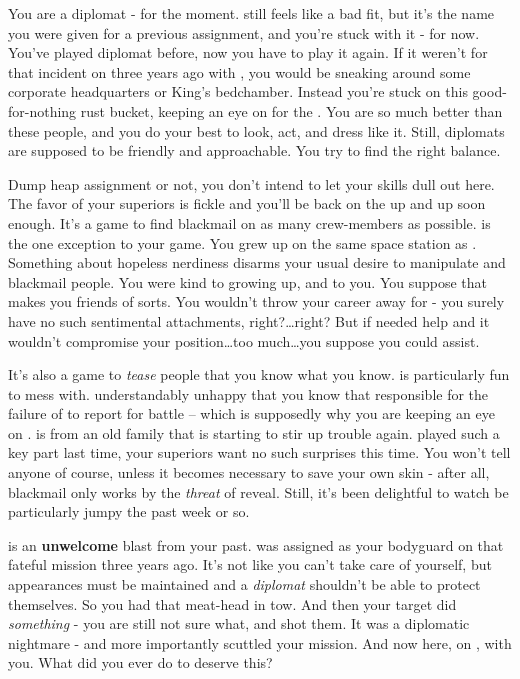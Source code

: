 \documentclass[char]{TMFHope}
\begin{document}
\name{\cDip{}}

You are a diplomat - for the moment. \cDip{\full} still feels like a bad fit, but it's the name you were given for a previous assignment, and you're stuck with it - for now. You've played diplomat before, now you have to play it again. If it weren't for that incident on \pHome{} three years ago with \cWeap{\full}, you would be sneaking around some corporate headquarters or King's bedchamber. Instead you're stuck on this good-for-nothing rust bucket, keeping an eye on \cXO{\full} for the \pPlan{}. You are so much better than these people, and you do your best to look, act, and dress like it. Still, diplomats are supposed to be friendly and approachable. You try to find the right balance.

Dump heap assignment or not, you don't intend to let your skills dull out here. The favor of your superiors is fickle and you'll be back on the up and up soon enough. It's a game to find blackmail on as many crew-members as possible. \cMed{\full} is the one exception to your game. You grew up on the same space station as \cMed{\them}. Something about \cMed{\their} hopeless nerdiness disarms your usual desire to manipulate and blackmail people. You were kind to \cMed{\them} growing up, and \cMed{\they} to you. You suppose that makes you friends of sorts. You wouldn't throw your career away for \cMed{\them} - you surely have no such sentimental attachments, right?\ldots right? But if \cMed{} needed help and it wouldn't compromise your position\ldots too much\ldots you suppose you could assist.

It's also a game to \emph{tease} people that you know what you know. \cXO{} is particularly fun to mess with. \cXO{\They} \cXO{\are} understandably unhappy that you know that \cXO{\they} \cXO{\are} responsible for the failure of \pOld{} to report for battle -- which is supposedly why you are keeping an eye on \cXO{\them}. \cXO{} is from an old \pEdge{} family that is starting to stir up trouble again. \cXO{\They} played such a key part last time, your superiors want no such surprises this time. You won't tell anyone of course, unless it becomes necessary to save your own skin - after all, blackmail only works by the \emph{threat} of reveal. Still, it's been delightful to watch \cXO{} be particularly jumpy the past week or so. 

\cWeap{} is an {\bf unwelcome} blast from your past. \cWeap{} was assigned as your bodyguard on that fateful mission three years ago. It's not like you can't take care of yourself, but appearances must be maintained and a \emph{diplomat} shouldn't be able to protect themselves. So you had that meat-head in tow. And then your target did \emph{something} - you are still not sure what, and \cWeap{} shot them. It was a diplomatic nightmare - and more importantly scuttled your mission. And now \cWeap{\they} \cWeap{\are} here, on \pNew{}, with you. What did you ever do to deserve this?
\end{document}

